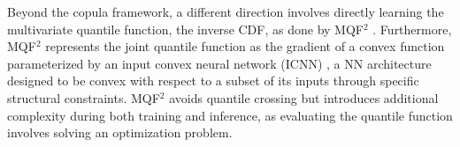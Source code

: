 \documentclass[a4paper,oneside,bibliography=totoc]{scrbook}
\begin{document}
Beyond the copula framework, a different direction involves directly learning the multivariate quantile function, the inverse CDF, as done by MQF$^2$ \cite{kan_multivariate_2022}.
Furthermore, MQF$^2$ represents the joint quantile function as the gradient of a convex function parameterized by an input convex neural network (ICNN) \cite{amos_input_2017}, a NN architecture designed to be convex with respect to a subset of its inputs through specific structural constraints.
MQF$^2$ avoids quantile crossing but introduces additional complexity during both training and inference, as evaluating the quantile function involves solving an optimization problem.
\end{document}
